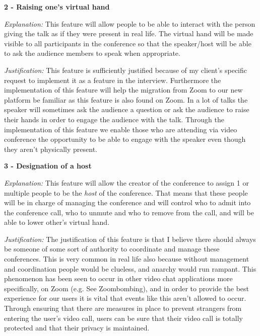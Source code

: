\vspace{0.2cm}

\textsf{\bfseries 2 - Raising one's virtual hand} \\ \vspace{0.1cm}

\textit{Explanation:} This feature will allow people to be
able to interact with the
person giving the talk as if they were present in real life.
The virtual hand will be made visible to all participants in
the conference so that the speaker/host will be able to ask
the audience members to speak when appropriate.\\
\vspace{0.1cm}

\textit{Justification:} This feature
is sufficiently justified because of my client's specific
request to implement it as a feature in the interview.
Furthermore the implementation of this feature will help the
migration from Zoom to our new platform be familiar as this
feature is also found on Zoom. In a lot of talks the speaker
will sometimes ask the audience a question or ask the audience
to raise their hands in order to engage the audience with the
talk. Through the implementation of this feature we enable
those who are attending via video conference the opportunity
to be able to engage with the speaker even though they aren't
physically present.

\vspace{0.2cm}

\textsf{\bfseries 3 - Designation of a host} \\ \vspace{0.1cm}

\textit{Explanation:} This feature will allow the creator of
the conference to assign 1 or multiple people to be the
\textit{host} of the conference. That means that these
people will be in charge of
managing the conference and will control who to admit into the
conference call, who to unmute and who to remove from the
call, and will be able to lower other's virtual hand.
\vspace{0.1cm}

\textit{Justification:} The
justification of this feature is that I believe there should
always be someone of some sort of authority to coordinate and
manage these conferences. This is very common in real life
also because without management and coordination people
would be clueless, and anarchy would run rampant. This
phenomenon has been seen to occur in other video chat
applications more specifically, on Zoom
(e.g. See Zoombombing), and in order to provide the
best experience for our users it is vital that events like
this aren't allowed to occur. Through ensuring that there are
measures in place to prevent strangers from entering the
user's video call, users can be sure that their video call is
totally protected and that their privacy is maintained.

